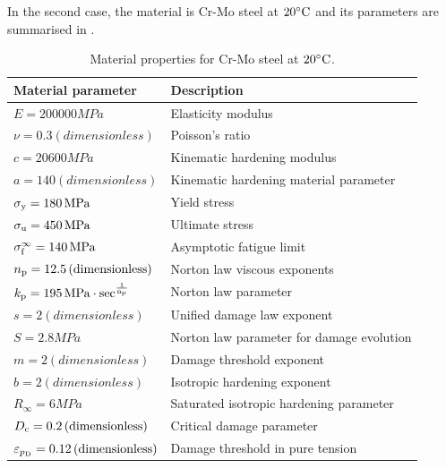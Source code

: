 In the second case, the material is Cr-Mo steel at $20^\circ \rm C$ and its parameters are summarised in  \parencite{lemaitre2005engineering}.
\begin{table}[hbt!]
	\caption{Material properties for Cr-Mo steel at $20^\circ \rm C$.}
	\label{tab:mat_pro20}
	\centering
	\begin{tabular}{ll}
		\toprule
		\textbf{Material parameter}                            & \textbf{Description}                      \\
		\midrule
		$E = 200000\unit{MPa} $                                & Elasticity modulus                        \\
		$\nu = 0.3\unit{(dimensionless)} $                     & Poisson's ratio                           \\
		$c = 20600\unit{MPa}$                                  & Kinematic hardening modulus               \\
		$ a=140\unit{(dimensionless)}$                         & Kinematic hardening material parameter    \\
		$ \sigma_{\rm y} = 180\,{\rm MPa} $                     & Yield stress                              \\
		$ \sigma_{\rm u} = 450\,{\rm MPa} $                     & Ultimate stress                           \\
		$ \sigma_{\rm f}^\infty = 140\,{\rm MPa} $              & Asymptotic fatigue limit                  \\
		$ {n_{\rm p}}=12.5\,{\rm (dimensionless)} $                     & Norton law viscous exponents              \\
		$ k_{\rm p}=195\,{\rm MPa \cdot sec^\frac{1}{{n_{\rm p}}}} $          & Norton law parameter                      \\
		$s = 2\unit{(dimensionless)}$                          & Unified damage law exponent               \\
		$S = 2.8\unit{MPa} $                                   & Norton law parameter for damage evolution \\
		$m = 2\unit{(dimensionless)}$                          & Damage threshold exponent                 \\
		$b = 2\unit{(dimensionless)}$                          & Isotropic hardening exponent              \\
		$R_\infty = 6\unit{MPa} $                              & Saturated isotropic hardening parameter   \\
		$D_{\rm c} = 0.2\,{\rm (dimensionless)}$                & Critical damage parameter                 \\
		$\varepsilon_{p_{\rm D}} = 0.12\,{\rm (dimensionless)}$ & Damage threshold in pure tension          \\
		\bottomrule
	\end{tabular}
\end{table}

